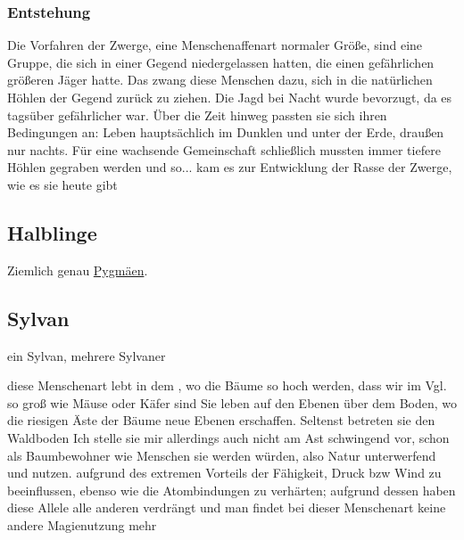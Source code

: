 \subsubsection{Entstehung}
Die Vorfahren der Zwerge, eine Menschenaffenart normaler Größe, sind eine Gruppe, die sich in einer Gegend niedergelassen hatten, die einen gefährlichen größeren Jäger hatte. Das zwang diese Menschen dazu, sich in die natürlichen Höhlen der Gegend zurück zu ziehen. Die Jagd bei Nacht wurde bevorzugt, da es tagsüber gefährlicher war. Über die Zeit hinweg passten sie sich ihren Bedingungen an: Leben hauptsächlich im Dunklen und unter der Erde, draußen nur nachts. Für eine wachsende Gemeinschaft schließlich mussten immer tiefere Höhlen gegraben werden und so... kam es zur Entwicklung der Rasse der Zwerge, wie es sie heute gibt



\subsection{Halblinge} \label{rasse:halbling}
Ziemlich genau \href{https://de.wikipedia.org/wiki/Pygm\%C3\%A4en}{Pygmäen}.


\subsection{Sylvan} \label{rasse:sylvan}
ein Sylvan, mehrere Sylvaner
\begin{outline}
	\1 diese Menschenart lebt in dem , wo die Bäume so hoch werden, dass wir im Vgl. so groß wie Mäuse oder Käfer sind
	\1 Sie leben auf den Ebenen über dem Boden, wo die riesigen Äste der Bäume neue Ebenen erschaffen. Seltenst betreten sie den Waldboden
	\1 Ich stelle sie mir allerdings auch nicht am Ast schwingend vor, schon als Baumbewohner wie Menschen sie werden würden, also Natur unterwerfend und nutzen.
	\1 aufgrund des extremen Vorteils der Fähigkeit, Druck bzw Wind zu beeinflussen, ebenso wie die Atombindungen zu verhärten; aufgrund dessen haben diese Allele alle anderen verdrängt und man findet bei dieser Menschenart keine andere Magienutzung mehr
\end{outline}

